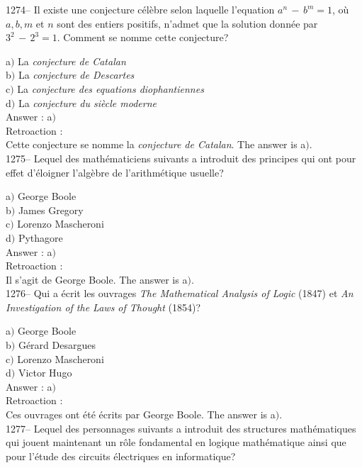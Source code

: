 ﻿\documentclass[letterpaper, 12pt]{article}
\begin{document}
1274-- Il existe une conjecture c\'el\`ebre selon laquelle
l'equation $a^n\,-\,b^m=1$, o\`u $a,b,m$ et $n$ sont des entiers
positifs, n'admet que la solution donn\'ee par $3^2\,-\,2^3=1$.
Comment se nomme cette conjecture?

a$)$ La {\sl conjecture de Catalan} \\
b$)$ La {\sl conjecture de Descartes} \\
c$)$ La {\sl conjecture des equations diophantiennes} \\
d$)$ La {\sl conjecture du si\`ecle moderne}\\

Answer : a$)$\\

Retroaction : \\
Cette conjecture se nomme la {\sl conjecture de Catalan}.
The answer is a$)$.\\

1275-- Lequel des math\'ematiciens suivants a introduit des
principes qui ont pour effet d'\'eloigner l'alg\`ebre de
l'arithm\'etique usuelle?

a$)$ George Boole \\
b$)$ James Gregory \\
c$)$ Lorenzo Mascheroni \\
d$)$ Pythagore\\

Answer : a$)$\\

Retroaction : \\
Il s'agit de George Boole.
The answer is a$)$.\\

1276-- Qui a \'ecrit les ouvrages {\sl The Mathematical Analysis of
Logic} (1847) et {\sl An Investigation of the Laws of Thought}
(1854)?

a$)$ George Boole \\
b$)$ G\'erard Desargues \\
c$)$ Lorenzo Mascheroni \\
d$)$ Victor Hugo\\

Answer : a$)$\\

Retroaction : \\
Ces ouvrages ont \'et\'e \'ecrits par George Boole.
The answer is a$)$.\\

1277-- Lequel des personnages suivants a introduit des structures
math\'ematiques qui jouent maintenant un r\^ole fondamental en
logique math\'ematique ainsi que pour l'\'etude des circuits
\'electriques en informatique?
\end{document}
